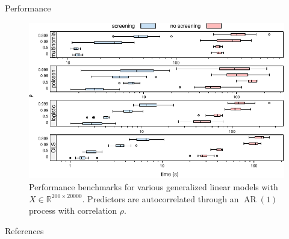 \documentclass[10pt,ignorenonframetext]{beamer}
\newif\ifbibliography
\begin{document}
\begin{frame}{Performance}
\begin{figure}
\centering
\includegraphics[width=\linewidth]{figures/performance.pdf}
\caption{Performance benchmarks for various generalized linear models
with \(X \in \mathbb{R}^{200 \times 20000}\). Predictors are autocorrelated through an
\(\operatorname{AR}(1)\) process with correlation \(\rho\).}
\end{figure}
\end{frame}

\begin{frame}[allowframebreaks]{References}
  \bibliographytrue
  \printbibliography[heading=none]
\end{frame}
\end{document}
